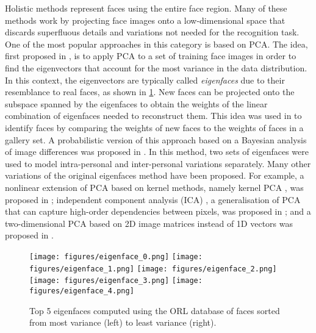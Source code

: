 \documentclass[conference]{IEEEtran}
\begin{document}
Holistic methods represent faces using the entire face region. Many of these methods work by projecting face images onto a low-dimensional space that discards superfluous details and variations not needed for the recognition task. One of the most popular approaches in this category is based on PCA. The idea, first proposed in \cite{sirovich1987low,kirby1990application}, is to apply PCA to a set of training face images in order to find the eigenvectors that account for the most variance in the data distribution. In this context, the eigenvectors are typically called \textit{eigenfaces} due to their resemblance to real faces, as shown in \cref{fig:eigenfaces}. New faces can be projected onto the subspace spanned by the eigenfaces to obtain the weights of the linear combination of eigenfaces needed to reconstruct them. This idea was used in \cite{turk1991eigenfaces} to identify faces by comparing the weights of new faces to the weights of faces in a gallery set. A probabilistic version of this approach based on a Bayesian analysis of image differences was proposed in \cite{moghaddam1998beyond}. In this method, two sets of eigenfaces were used to model intra-personal and inter-personal variations separately. Many other variations of the original eigenfaces method have been proposed. For example,
a nonlinear extension of PCA based on kernel methods, namely kernel PCA \cite{scholkopf1997kernel}, was proposed in \cite{kim2002face}; independent component analysis (ICA) \cite{comon1994independent}, a generalisation of PCA that can capture high-order dependencies between pixels, was proposed in \cite{bartlett2001independent}; and a two-dimensional PCA based on 2D image matrices instead of 1D vectors was proposed in \cite{yang2004two}.

\begin{figure}[tb]
    \centering
    \texttt{[image: figures/eigenface\_0.png]}\hspace{0.04\linewidth}
    \texttt{[image: figures/eigenface\_1.png]}\hspace{0.04\linewidth}
    \texttt{[image: figures/eigenface\_2.png]}\hspace{0.04\linewidth}
    \texttt{[image: figures/eigenface\_3.png]}\hspace{0.04\linewidth}
    \texttt{[image: figures/eigenface\_4.png]}
    \caption{Top 5 eigenfaces computed using the ORL database of faces \cite{samaria1994parameterisation} sorted from most variance (left) to least variance (right).}
    \label{fig:eigenfaces}
\end{figure}
\end{document}
